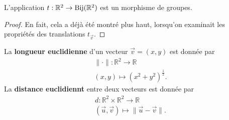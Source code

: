 \documentclass{book}
\numberwithin{equation}{section}
\providecommand{\plan}{{\mathbb R^2}}
\providecommand{\trans}[1]{{t_{#1}}}
\providecommand{\bij}[1]{{\textnormal{Bij}(#1)}}
\providecommand{\bijR}{{\bij{\plan}}}
\providecommand{\longueur}[1]{{\lVert#1\rVert}}
\begin{document}
\begin{prop}
	L'application $t : \plan \to \bijR$ est un morphisme de groupes.
	\begin{proof}
		En fait, cela a déjà été montré plus haut, lorsqu'on examinait les propriétés des translations $\trans{\vec v}$.
	\end{proof}
\end{prop}

\begin{defn}
	La \textbf{longueur euclidienne} d'un vecteur $\vec v = (x, y)$ est donnée par
	\begin{align*}
		\longueur{\cdot} : \plan \to \mathbb R\\
		(x, y) \mapsto (x^2 + y^2)^{\frac12}.
	\end{align*}
	La \textbf{distance euclidiennt} entre deux vecteurs est donnée par
	\begin{align*}
		d : \plan \times \plan \to \mathbb R\\
		(\vec u, \vec v) \mapsto \longueur{\vec u - \vec v}.
	\end{align*}
\end{defn}
\end{document}
